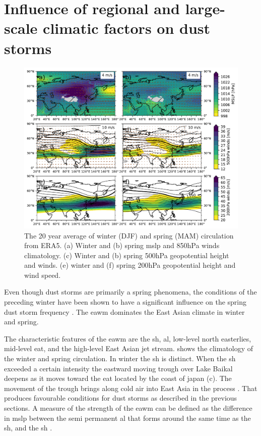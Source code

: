 \section{Influence of regional and large-scale climatic factors on dust storms}
\begin{figure}[htpb]
    \centering
    \includegraphics[width=\textwidth]{texfiles/figs/climatology_1999-2019.pdf}
    \caption{The 20 year average of winter (DJF)  and spring (MAM) circulation from ERA5. (a) Winter and (b) spring \acrshort{mslp} and 850hPa winds climatology. (c) Winter and (b) spring 500hPa geopotential height and winds. (e) winter and (f) spring 200hPa geopotential height and wind speed.}
    \label{fig:clim_circulation}
\end{figure}

Even though dust storms are primarily a spring phenomena, the conditions of the preceding winter have been shown to have a significant influence on the spring dust storm frequency \parencite{he2017impact, liu2018influence, gong2006simulated}. 
The \acrshort{eawm} dominates the East Asian climate in winter and spring. 

The characteristic features of the \acrshort{eawm} are the \acrfull{sh}, \acrfull{al}, low-level north easterlies, mid-level \acrfull{eat}, and the high-level East Asian jet stream. 
 shows the climatology of the winter and spring  circulation. 
In winter the \acrshort{sh} is distinct. 
When the \acrshort{sh} exceeded a certain intensity the eastward moving trough over Lake Baikal deepens as it moves toward the \acrshort{eat} located by the coast of japan (c). 
The movement of the trough brings along cold air into East Asia in the process \parencite{he2017impact}. 
That produces favourable conditions for dust storms as described in the previous sections. 
A measure of the strength of the \acrshort{eawm} can be defined as the difference in \acrshort{mslp} between the semi permanent \acrshort{al} that forms around the same time as the \acrshort{sh}, and the \acrshort{sh} \parencite{yoshiike2009influence}. 

